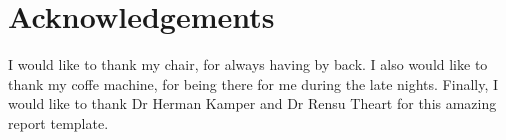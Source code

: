 \chapter*{Acknowledgements}
\makeatletter{}\makeatother

I would like to thank my chair, for always having by back. I also would like to thank my coffe machine, for being there for me during the late nights. Finally, I would like to thank Dr Herman Kamper and Dr Rensu Theart for this amazing report template.